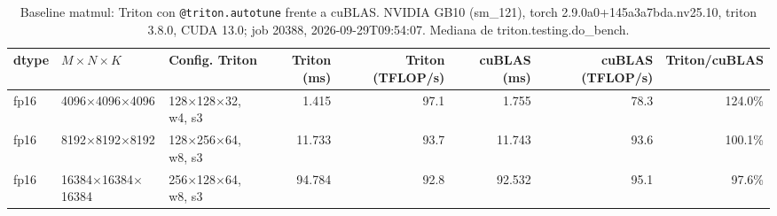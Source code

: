 \begin{table}[htbp]
  \centering\small
  \begin{tabular}{lllrrrrr}
    \toprule
    dtype & $M \times N \times K$ & Config. Triton & Triton (ms) & Triton (TFLOP/s) & cuBLAS (ms) & cuBLAS (TFLOP/s) & Triton/cuBLAS \\
    \midrule
    fp16 & 4096$\times$4096$\times$4096 & 128$\times$128$\times$32, w4, s3 & 1.415 & 97.1 & 1.755 & 78.3 & 124.0\% \\
    fp16 & 8192$\times$8192$\times$8192 & 128$\times$256$\times$64, w8, s3 & 11.733 & 93.7 & 11.743 & 93.6 & 100.1\% \\
    fp16 & 16384$\times$16384$\times$16384 & 256$\times$128$\times$64, w8, s3 & 94.784 & 92.8 & 92.532 & 95.1 & 97.6\% \\
    \bottomrule
  \end{tabular}
  \caption{Baseline matmul: Triton con \texttt{@triton.autotune} frente a cuBLAS. NVIDIA GB10 (sm\_121), torch 2.9.0a0+145a3a7bda.nv25.10, triton 3.8.0, CUDA 13.0; job 20388, 2026-09-29T09:54:07. Mediana de triton.testing.do\_bench.}
  \label{tab:baseline-matmul}
\end{table}
